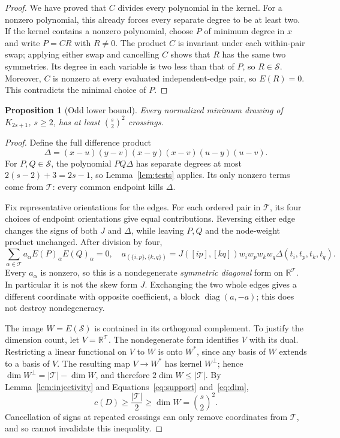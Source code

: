 \documentclass[11pt,a4paper]{article}
\newtheorem{proposition}[theorem]{Proposition}
\theoremstyle{remark}
\numberwithin{equation}{section}
\newcommand{\R}{\mathbb R}
\newcommand{\SSS}{\mathcal S}
\newcommand{\TT}{\mathcal T}
\begin{document}
\begin{proof}
We have proved that \(C\) divides every polynomial in the kernel.
For a nonzero polynomial, this already forces every separate degree
to be at least two. If the kernel contains a nonzero polynomial,
choose \(P\) of minimum degree in \(x\) and write \(P=CR\)
with \(R\ne0\).
The product \(C\) is invariant under each within-pair swap;
applying either swap and cancelling \(C\) shows that \(R\)
has the same two symmetries. Its degree in each variable is two
less than that of \(P\), so \(R\in\SSS\).
Moreover, \(C\) is nonzero at every evaluated independent-edge pair,
so \(E(R)=0\). This contradicts the minimal choice of \(P\).
\end{proof}

\begin{proposition}[Odd lower bound]\label{prop:odd}
Every normalized minimum drawing of \(K_{2s+1}\), \(s\ge2\),
has at least \(\binom{s}{2}^{2}\) crossings.
\end{proposition}

\begin{proof}
Define the full difference product
\[
\Delta=(x-u)(y-v)(x-y)(x-v)(u-y)(u-v).
\]
For \(P,Q\in\SSS\), the polynomial \(PQ\Delta\) has separate degrees
at most \(2(s-2)+3=2s-1\), so Lemma~\ref{lem:tests} applies.
Its only nonzero terms come from \(\TT\): every common endpoint
kills \(\Delta\).

Fix representative orientations for the edges. For each ordered
pair in \(\TT\), its four choices of endpoint orientations give
equal contributions. Reversing either edge changes the signs of
both \(J\) and \(\Delta\), while leaving \(P,Q\) and the node-weight
product unchanged. After division by four,
\[
\sum_{\alpha\in\TT}a_\alpha E(P)_\alpha E(Q)_\alpha=0,
\quad
a_{(\{i,p\},\{k,q\})}
=J([ip],[kq])w_iw_pw_kw_q
\Delta(t_i,t_p,t_k,t_q).
\]
Every \(a_\alpha\) is nonzero, so this is a nondegenerate
\emph{symmetric diagonal} form on \(\R^\TT\).
In particular it is not the skew form \(J\). Exchanging the two
whole edges gives a different coordinate with opposite coefficient,
a block \(\operatorname{diag}(a,-a)\); this does not destroy
nondegeneracy.

The image \(W=E(\SSS)\) is contained in its orthogonal complement.
To justify the dimension count, let \(V=\R^\TT\). The nondegenerate
form identifies \(V\) with its dual. Restricting a linear functional
on \(V\) to \(W\) is onto \(W^*\), since any basis of \(W\) extends
to a basis of \(V\). The resulting map \(V\to W^*\) has kernel
\(W^\perp\); hence
\(\dim W^\perp=|\TT|-\dim W\), and therefore
\(2\dim W\le|\TT|\).
By Lemma~\ref{lem:injectivity} and Equations~\eqref{eq:support}
and~\eqref{eq:dim},
\[
c(D)\ge\frac{|\TT|}{2}\ge\dim W=\binom{s}{2}^{\!2}.
\]
Cancellation of signs at repeated crossings can only remove
coordinates from \(\TT\), and so cannot invalidate this inequality.
\end{proof}
\end{document}

